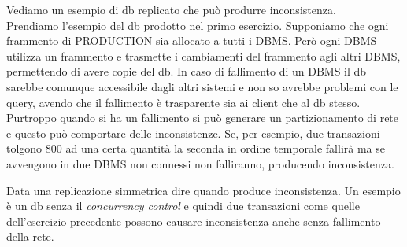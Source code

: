 \documentclass[a4paper,12pt, oneside]{book}
\begin{document}
\begin{esercizio}
  Vediamo un esempio di db replicato che può produrre inconsistenza.\\
  Prendiamo l'esempio del db prodotto nel primo esercizio. Supponiamo che ogni
  frammento di \textnormal{PRODUCTION} sia allocato a tutti i DBMS. Però ogni
  DBMS utilizza un frammento e trasmette i cambiamenti del frammento agli altri
  DBMS, permettendo di avere copie del db. In caso di fallimento di un DBMS il
  db sarebbe comunque accessibile dagli altri sistemi e non so avrebbe problemi
  con le query, avendo che il fallimento è trasparente sia ai client che al db
  stesso. Purtroppo quando si ha un fallimento si può generare un
  partizionamento di rete e questo può comportare delle inconsistenze. Se, per
  esempio, due transazioni tolgono 800 ad una certa quantità la seconda in
  ordine temporale fallirà ma se avvengono in due DBMS non connessi non
  falliranno, producendo inconsistenza.
\end{esercizio}
\begin{esercizio}
  Data una replicazione simmetrica dire quando produce inconsistenza.
  Un esempio è un db senza il \textit{concurrency control} e quindi due
  transazioni come quelle dell'esercizio precedente possono causare
  inconsistenza anche senza fallimento della rete.
\end{esercizio}
\end{document}
